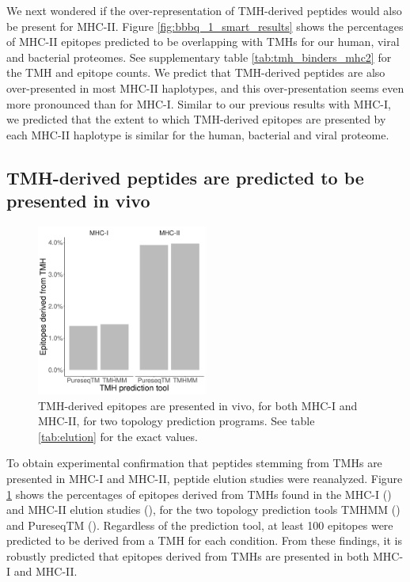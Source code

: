 We next wondered if the over-representation of TMH-derived peptides would also be present for MHC-II. 
Figure \ref{fig:bbbq_1_smart_results} shows the percentages of MHC-II epitopes predicted to be overlapping 
with TMHs for our human, viral and bacterial proteomes.
See supplementary table \ref{tab:tmh_binders_mhc2} 
for the TMH and epitope counts.
We predict that TMH-derived peptides are also over-presented in most MHC-II haplotypes, and this over-presentation seems even more pronounced than for MHC-I. 
Similar to our previous results with MHC-I, we predicted that the extent to which TMH-derived
epitopes are presented by each MHC-II haplotype is similar for the human, bacterial and viral proteome.

\subsection{TMH-derived peptides are predicted to be presented in vivo}

\begin{figure}[!htbp]
  \centering
  \includegraphics[width=0.5\textwidth]{bbbq_article_issue_157/results.png}
  \caption{
    TMH-derived epitopes are presented in vivo,
    for both MHC-I and MHC-II, for two topology prediction
    programs.
    See table \ref{tab:elution} for the exact values.
  }
  \label{fig:elution}
\end{figure}

To obtain experimental confirmation that peptides stemming from TMHs are presented in MHC-I and MHC-II,
peptide elution studies were reanalyzed.
Figure \ref{fig:elution} shows the percentages of epitopes derived 
from TMHs
found in the MHC-I (\cite{schellens2015comprehensive}) and MHC-II elution 
studies  (\cite{bergseng2015different}),
for the two topology prediction tools TMHMM (\cite{krogh2001predicting}) and PureseqTM (\cite{wang2019efficient}). 
Regardless of the prediction tool, 
at least 100 epitopes were predicted to be derived from a TMH for each condition. 
From these findings, it is robustly predicted that
epitopes derived from TMHs are presented in both MHC-I and MHC-II.

